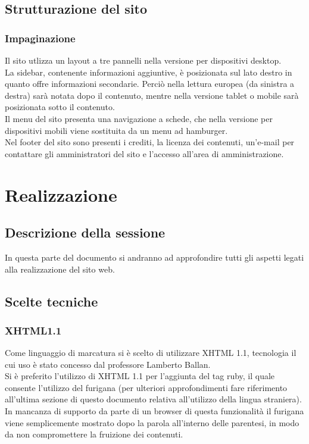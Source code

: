 \documentclass[openany, a4paper, 12pt]{report}
\begin{document}
	\section{Strutturazione del sito}
		\subsection{Impaginazione}
		Il sito utlizza un layout a tre pannelli nella versione per dispositivi desktop.\\
		La sidebar, contenente informazioni aggiuntive, è posizionata sul lato destro in quanto offre informazioni secondarie. Perciò nella lettura europea (da sinistra a destra) sarà notata dopo il contenuto, mentre nella versione tablet o mobile sarà posizionata sotto il contenuto.\\
		Il menu del sito presenta una navigazione a schede, che nella versione per dispositivi mobili viene sostituita da un menu ad hamburger.\\
		Nel footer del sito sono presenti i crediti, la licenza dei contenuti, un'e-mail per contattare gli amministratori del sito e l'accesso all'area di amministrazione.

	\chapter{Realizzazione}
		\section{Descrizione della sessione}
		In questa parte del documento si andranno ad approfondire tutti gli aspetti legati alla realizzazione del sito web.

	\section{Scelte tecniche}
		\subsection{XHTML1.1}
		Come linguaggio di marcatura si è scelto di utilizzare XHTML 1.1, tecnologia il cui uso è stato concesso dal professore Lamberto Ballan.\\
		Si è preferito l'utilizzo di XHTML 1.1 per l'aggiunta del tag ruby, il quale consente l'utilizzo del furigana (per ulteriori approfondimenti fare riferimento all'ultima sezione di questo documento relativa all'utilizzo della lingua straniera).\\
		In mancanza di supporto da parte di un browser di questa funzionalità il furigana viene semplicemente mostrato dopo la parola all'interno delle parentesi, in modo da non compromettere la fruizione dei contenuti.
\end{document}
